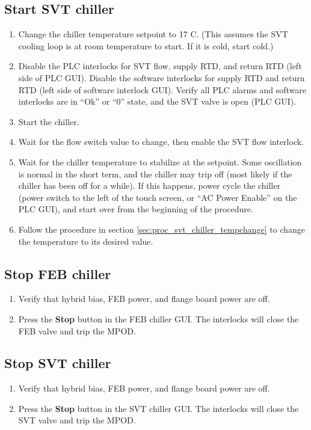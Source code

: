 \subsection{Start SVT chiller}
\begin{enumerate}
    \item Change the chiller temperature setpoint to 17 C. (This assumes the SVT cooling loop is at room temperature to start. If it is cold, start cold.)
    \item Disable the PLC interlocks for SVT flow, supply RTD, and return RTD (left side of PLC GUI).
        Disable the software interlocks for supply RTD and return RTD (left side of software interlock GUI).
        Verify all PLC alarms and software interlocks are in ``Ok'' or ``0'' state, and the SVT valve is open (PLC GUI).
    \item Start the chiller.
    \item Wait for the flow switch value to change, then enable the SVT flow interlock.
    \item Wait for the chiller temperature to stabilize at the setpoint.
        Some oscillation is normal in the short term, and the chiller may trip off (most likely if the chiller has been off for a while).
        If this happens, power cycle the chiller (power switch to the left of the touch screen, or ``AC Power Enable'' on the PLC GUI), and start over from the beginning of the procedure.
    \item Follow the procedure in section \ref{sec:proc_svt_chiller_tempchange} to change the temperature to its desired value.
\end{enumerate}

\subsection{Stop FEB chiller}
\begin{enumerate}
    \item Verify that hybrid bias, FEB power, and flange board power are off.
    \item Press the \textbf{Stop} button in the FEB chiller GUI. The interlocks will close the FEB valve and trip the MPOD.
\end{enumerate}

\subsection{Stop SVT chiller}
\begin{enumerate}
    \item Verify that hybrid bias, FEB power, and flange board power are off.
    \item Press the \textbf{Stop} button in the SVT chiller GUI. The interlocks will close the SVT valve and trip the MPOD.
\end{enumerate}

